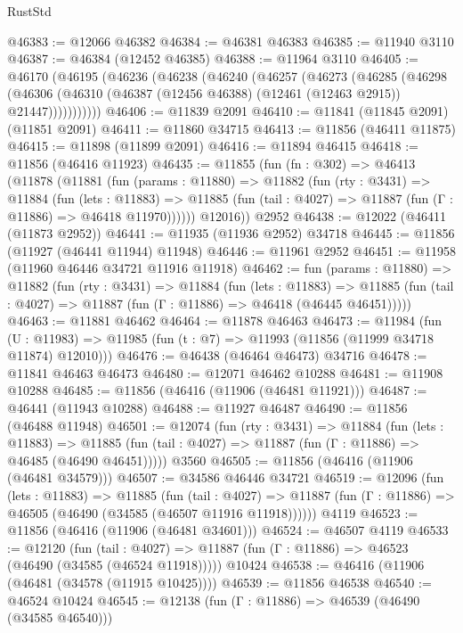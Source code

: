 \begin{lexlean}{RustStd}
\begin{coremodule}
@46383 := @12066 @46382
@46384 := @46381 @46383
@46385 := @11940 @3110
@46387 := @46384 (@12452 @46385)
@46388 := @11964 @3110
@46405 := @46170
    (@46195
      (@46236
        (@46238
          (@46240
            (@46257
              (@46273
                (@46285
                  (@46298
                    (@46306
                      (@46310 (@46387 (@12456 @46388) (@12461 (@12463 @2915)) @21447)))))))))))
@46406 := @11839 @2091
@46410 := @11841 (@11845 @2091) (@11851 @2091)
@46411 := @11860 @34715
@46413 := @11856 (@46411 @11875)
@46415 := @11898 (@11899 @2091)
@46416 := @11894 @46415
@46418 := @11856 (@46416 @11923)
@46435 := @11855
    (fun (fn : @302) =>
    @46413
      (@11878
        (@11881
          (fun (params : @11880) =>
          @11882
            (fun (rty : @3431) =>
            @11884
              (fun (lets : @11883) =>
              @11885 (fun (tail : @4027) => @11887 (fun (Γ : @11886) => @46418 @11970))))))
        @12016))
    @2952
@46438 := @12022 (@46411 (@11873 @2952))
@46441 := @11935 (@11936 @2952) @34718
@46445 := @11856 (@11927 (@46441 @11944) @11948)
@46446 := @11961 @2952
@46451 := @11958 (@11960 @46446 @34721 @11916 @11918)
@46462 := fun (params : @11880) =>
  @11882
    (fun (rty : @3431) =>
    @11884
      (fun (lets : @11883) =>
      @11885 (fun (tail : @4027) => @11887 (fun (Γ : @11886) => @46418 (@46445 @46451)))))
@46463 := @11881 @46462
@46464 := @11878 @46463
@46473 := @11984
    (fun (U : @11983) => @11985 (fun (t : @7) => @11993 (@11856 (@11999 @34718 @11874) @12010)))
@46476 := @46438 (@46464 @46473) @34716
@46478 := @11841 @46463 @46473
@46480 := @12071 @46462 @10288
@46481 := @11908 @10288
@46485 := @11856 (@46416 (@11906 (@46481 @11921)))
@46487 := @46441 (@11943 @10288)
@46488 := @11927 @46487
@46490 := @11856 (@46488 @11948)
@46501 := @12074
    (fun (rty : @3431) =>
    @11884
      (fun (lets : @11883) =>
      @11885 (fun (tail : @4027) => @11887 (fun (Γ : @11886) => @46485 (@46490 @46451)))))
    @3560
@46505 := @11856 (@46416 (@11906 (@46481 @34579)))
@46507 := @34586 @46446 @34721
@46519 := @12096
    (fun (lets : @11883) =>
    @11885
      (fun (tail : @4027) =>
      @11887 (fun (Γ : @11886) => @46505 (@46490 (@34585 (@46507 @11916 @11918))))))
    @4119
@46523 := @11856 (@46416 (@11906 (@46481 @34601)))
@46524 := @46507 @4119
@46533 := @12120
    (fun (tail : @4027) => @11887 (fun (Γ : @11886) => @46523 (@46490 (@34585 (@46524 @11918)))))
    @10424
@46538 := @46416 (@11906 (@46481 (@34578 (@11915 @10425))))
@46539 := @11856 @46538
@46540 := @46524 @10424
@46545 := @12138 (fun (Γ : @11886) => @46539 (@46490 (@34585 @46540)))

\end{coremodule}
\end{lexlean}
